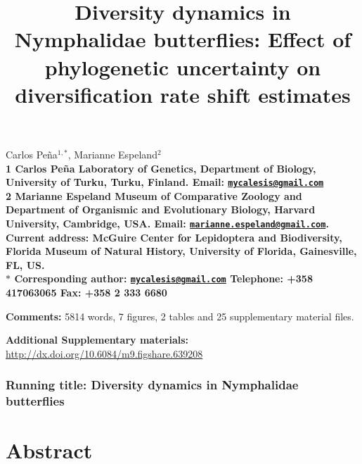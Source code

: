 \documentclass[10pt]{article}
\date{}
\begin{document}
\begin{flushleft}
{\Large
\title{Diversity dynamics in Nymphalidae butterflies: Effect of
phylogenetic uncertainty on diversification rate shift estimates}
}
\maketitle
Carlos Pe\~na$^{1,\ast}$,
Marianne Espeland$^{2}$
\\
\bf{1} Carlos Pe\~na Laboratory of Genetics, Department of Biology, University of Turku, Turku, Finland. Email: \href{mailto:mycalesis@gmail.com}{\nolinkurl{mycalesis@gmail.com}}
\\
\bf{2} Marianne Espeland Museum of Comparative Zoology and Department
of Organismic and Evolutionary Biology, Harvard University, Cambridge,
USA. Email:
\href{mailto:marianne.espeland@gmail.com}{\nolinkurl{marianne.espeland@gmail.com}}.
Current address: McGuire Center for Lepidoptera and Biodiversity,
Florida Museum of Natural History, University of Florida, Gainesville,
FL, US.
\\
$\ast$ \textbf{Corresponding author:}
\href{mailto:mycalesis@gmail.com}{\nolinkurl{mycalesis@gmail.com}}
Telephone: +358 417063065 Fax: +358 2 333 6680

\textbf{Comments:} 5814 words, 7 figures, 2 tables and 25 supplementary
material files.

\textbf{Additional Supplementary materials:}
\url{http://dx.doi.org/10.6084/m9.figshare.639208}
\end{flushleft}



\subsubsection*{Running title: Diversity dynamics in Nymphalidae
butterflies}

\section*{Abstract}
\end{document}
